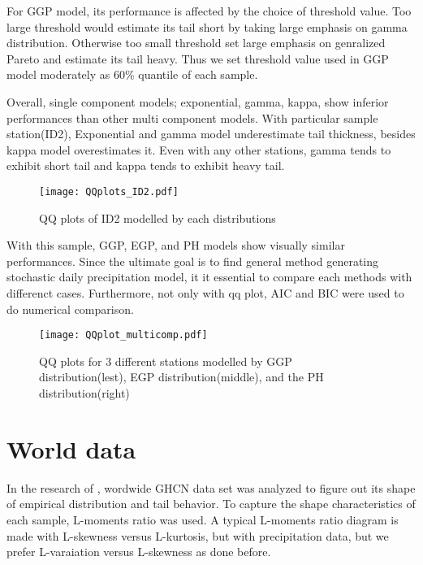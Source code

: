 \documentclass[12pt]{article}\usepackage[]{graphicx}\usepackage[]{color}
\begin{document}
For GGP model, its performance is affected by the choice of threshold value. Too large threshold would estimate its tail short by taking large emphasis on gamma distribution. Otherwise too small threshold set large emphasis on genralized Pareto and estimate its tail heavy. Thus we set threshold value used in GGP model moderately as 60\% quantile of each sample.

Overall, single component models; exponential, gamma, kappa, show inferior performances than other multi component models. With particular sample station(ID2), Exponential and gamma model underestimate tail thickness, besides kappa model overestimates it. Even with any other stations, gamma tends to exhibit short tail and kappa tends to exhibit heavy tail. 

\begin{figure}
  \centering
  \texttt{[image: QQplots\_ID2.pdf]}
  \caption{QQ plots of ID2 modelled by each distributions}
\end{figure}

With this sample, GGP, EGP, and PH models show visually similar performances. Since the ultimate goal is to find general method generating stochastic daily precipitation model, it it essential to compare each methods with differenct cases. Furthermore, not only with qq plot, AIC \cite{akaike1974new} and BIC \cite{schwarz1978estimating} were used to do numerical comparison.

\begin{figure}
  \centering
  \texttt{[image: QQplot\_multicomp.pdf]}
  \caption{QQ plots for 3 different stations modelled by GGP distribution(lest), EGP distribution(middle), and the PH distribution(right)}
\end{figure}







\section{World data}

In the research of \cite{papalexiou2012entropy}, wordwide GHCN data set was analyzed to figure out its shape of empirical distribution and tail behavior. To capture the shape characteristics of each sample, L-moments ratio was used. A typical L-moments ratio diagram is made with L-skewness versus L-kurtosis, but with precipitation data, but we prefer L-varaiation versus L-skewness as \cite{papalexiou2012entropy} done before. 
\end{document}
